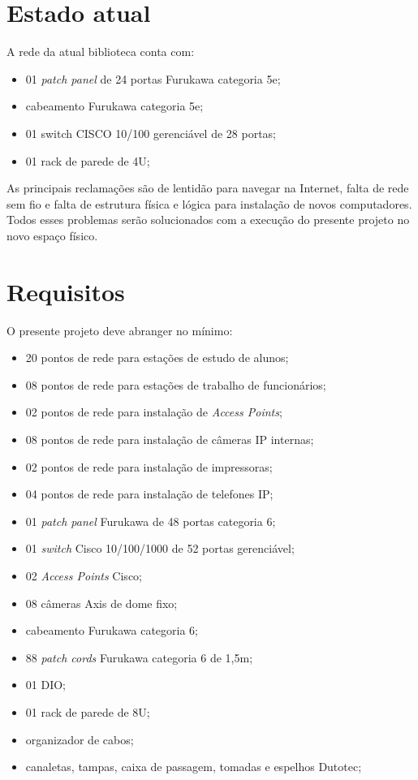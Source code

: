 \documentclass[	DIV=calc,%
							paper=a4,%
							fontsize=12pt,%
							onecolumn]{scrartcl}	 					%
\begin{document}
\section{Estado atual}
A rede da atual biblioteca conta com:

\begin{itemize}
	\item 01 \textit{patch panel} de 24 portas Furukawa categoria 5e;
	\item cabeamento Furukawa categoria 5e;
	\item 01 switch CISCO 10/100 gerenciável de 28 portas;
	\item 01 rack de parede de 4U;
\end{itemize}

As principais reclamações são de lentidão para navegar na Internet, falta de rede sem fio e falta de estrutura física e lógica para instalação de novos computadores. Todos esses problemas serão solucionados com a execução do presente projeto no novo espaço físico.

\section{Requisitos}
O presente projeto deve abranger no mínimo:

\begin{itemize}
	\item 20 pontos de rede para estações de estudo de alunos;
	\item 08 pontos de rede para estações de trabalho de funcionários;
	\item 02 pontos de rede para instalação de \textit{Access Points};
	\item 08 pontos de rede para instalação de câmeras IP internas;
	\item 02 pontos de rede para instalação de impressoras;
	\item 04 pontos de rede para instalação de telefones IP;
	\item 01 \textit{patch panel} Furukawa de 48 portas categoria 6;
	\item 01 \textit{switch} Cisco 10/100/1000 de 52 portas gerenciável;
	\item 02 \textit{Access Points} Cisco;
	\item 08 câmeras Axis de dome fixo;
	\item cabeamento Furukawa categoria 6;
	\item 88 \textit{patch cords} Furukawa categoria 6 de 1,5m;
	\item 01 DIO;
	\item 01 rack de parede de 8U;
	\item organizador de cabos;
	\item canaletas, tampas, caixa de passagem, tomadas e espelhos Dutotec;
\end{itemize}
\end{document}

